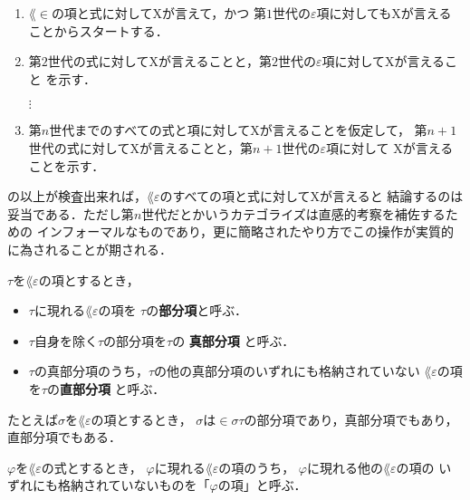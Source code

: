 	\begin{enumerate}
		\item $\lang{\in}$の項と式に対してXが言えて，かつ
			第$1$世代の$\varepsilon$項に対してもXが言えることからスタートする．
		\item 第$2$世代の式に対してXが言えることと，第$2$世代の$\varepsilon$項に対してXが言えること
			を示す．
			
			$\vdots$
			
		\item 第$n$世代までのすべての式と項に対してXが言えることを仮定して，
			第$n+1$世代の式に対してXが言えることと，第$n+1$世代の$\varepsilon$項に対して
			Xが言えることを示す．
	\end{enumerate}
	の以上が検査出来れば，$\lang{\varepsilon}$のすべての項と式に対してXが言えると
	結論するのは妥当である．ただし第$n$世代だとかいうカテゴライズは直感的考察を補佐するための
	インフォーマルなものであり，更に簡略されたやり方でこの操作が実質的に為されることが期される．
	
	\begin{screen}
		\begin{metadfn}
		\label{metadfn:L_epsilon_subterm_of_term}
			$\tau$を$\lang{\varepsilon}$の項とするとき，
			\begin{itemize}
				\item $\tau$に現れる$\lang{\varepsilon}$の項を
					$\tau$の{\bf 部分項}と呼ぶ．
				\item $\tau$自身を除く$\tau$の部分項を$\tau$の
					{\bf 真部分項}
					と呼ぶ．
				\item $\tau$の真部分項のうち，$\tau$の他の真部分項のいずれにも格納されていない
					$\lang{\varepsilon}$の項を$\tau$の{\bf 直部分項}
					と呼ぶ．
			\end{itemize}
		\end{metadfn}
	\end{screen}
	
	たとえば$\sigma$を$\lang{\varepsilon}$の項とするとき，
	$\sigma$は$\in \sigma \tau$の部分項であり，真部分項でもあり，直部分項でもある．
	
	\begin{screen}
		\begin{metadfn}
		\label{metadfn:L_epsilon_term_of_formula}
			$\varphi$を$\lang{\varepsilon}$の式とするとき，
			$\varphi$に現れる$\lang{\varepsilon}$の項のうち，
			$\varphi$に現れる他の$\lang{\varepsilon}$の項の
			いずれにも格納されていないものを「$\varphi$の項」と呼ぶ．
		\end{metadfn}
	\end{screen}
	
